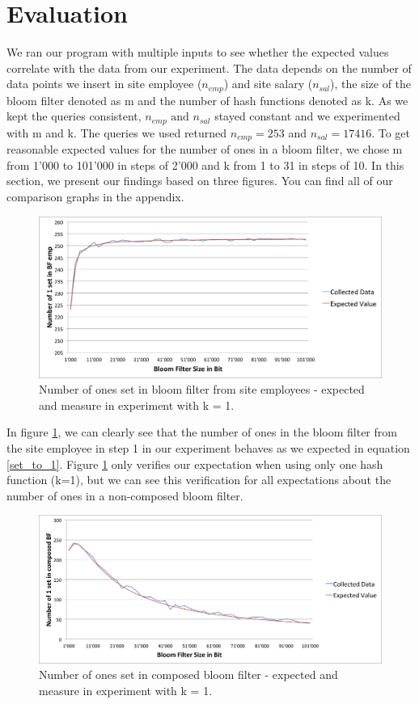 \documentclass[12]{scrartcl}
\begin{document}
\section{Evaluation}
We ran our program with multiple inputs to see whether the expected values correlate with the data from our experiment. The data depends on the number of data points we insert in site employee ($n_{emp}$) and site salary ($n_{sal}$), the size of the bloom filter denoted as m and the number of hash functions denoted as k. As we kept the queries consistent, $n_{emp} \text{ and } n_{sal}$ stayed constant and we experimented with m and k. The queries we used returned $n_{emp} = 253$ and $n_{sal} = 17416$. To get reasonable expected values for the number of ones in a bloom filter, we chose m from 1'000 to 101'000 in steps of 2'000 and k from 1 to 31 in steps of 10.
In this section, we present our findings based on three figures. You can find all of our comparison graphs in the appendix.
\begin{figure}[H]
	\begin{center}
		\includegraphics[scale=0.4]{res/1-emp.png}
	\end{center}
	\caption{Number of ones set in bloom filter from site employees - expected and measure in experiment with k = 1.}
	\label{fig:eval1}
\end{figure}
In figure \ref{fig:eval1}, we can clearly see that the number of ones in the bloom filter from the site employee in step 1 in our experiment behaves as we expected in equation \ref{set_to_1}. Figure \ref{fig:eval1} only verifies our expectation when using only one hash function (k=1), but we can see this verification for all expectations about the number of ones in a non-composed bloom filter.
\begin{figure}[H]
	\begin{center}
		\includegraphics[scale=0.4]{res/1-composed.png}
	\end{center}
	\caption{Number of ones set in composed bloom filter - expected and measure in experiment with k = 1.}
	\label{fig:eval2}
\end{figure}
\end{document}

